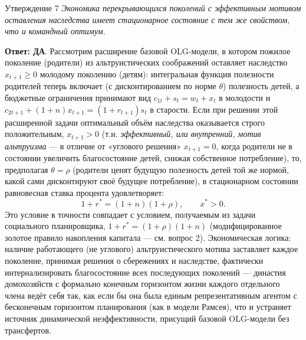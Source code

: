 \documentclass[10pt,a4paper]{article}
\newcommand{\qda}{\textbf{\color{yesgreen}Ответ: ДА}}
\newenvironment{answer}[2]{%
  \begin{qbox}{Утверждение #1}
  \textit{#2}\par\smallskip
}{%
  \end{qbox}\vspace{2pt}
}
\begin{document}
\begin{answer}{7}{Экономика перекрывающихся поколений с эффективным мотивом оставления наследства имеет стационарное состояние с тем же свойством, что и командный оптимум.}
\qda. Рассмотрим расширение базовой OLG-модели, в котором пожилое поколение (родители) из альтруистических соображений оставляет наследство $x_{t+1}\ge 0$ молодому поколению (детям): интегральная функция полезности родителей теперь включает (с дисконтированием по норме $\theta$) полезность детей, а бюджетные ограничения принимают вид $c_{1t}+s_t=w_t+x_t$ в молодости и $c_{2t+1}+(1+n)x_{t+1}=(1+r_{t+1})s_t$ в старости. Если при решении этой расширенной задачи оптимальный объём наследства оказывается строго положительным, $x_{t+1}>0$ (т.н. \emph{эффективный, или внутренний, мотив альтруизма} — в отличие от «углового решения» $x_{t+1}=0$, когда родители не в состоянии увеличить благосостояние детей, снижая собственное потребление), то, предполагая $\theta=\rho$ (родители ценят будущую полезность детей той же нормой, какой сами дисконтируют своё будущее потребление), в стационарном состоянии равновесная ставка процента удовлетворяет:
\[
1+r^{*} = (1+n)(1+\rho), \qquad x^{*}>0.
\]
Это условие в точности совпадает с условием, получаемым из задачи социального планировщика, $1+r^{*}=(1+\rho)(1+n)$ (модифицированное золотое правило накопления капитала — см. вопрос 2). Экономическая логика: наличие работающего (не углового) альтруистического мотива заставляет каждое поколение, принимая решения о сбережениях и наследстве, фактически интернализировать благосостояние всех последующих поколений — династия домохозяйств с формально конечным горизонтом жизни каждого отдельного члена ведёт себя так, как если бы она была единым репрезентативным агентом с бесконечным горизонтом планирования (как в модели Рамсея), что и устраняет источник динамической неэффективности, присущий базовой OLG-модели без трансфертов.
\end{answer}
 
\end{document}
